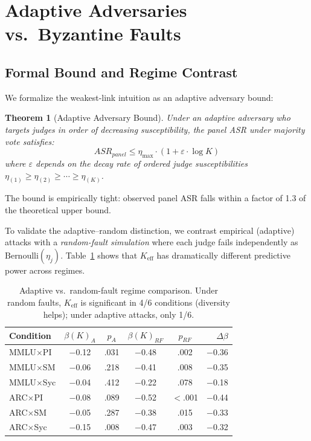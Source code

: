 \documentclass[11pt,a4paper]{article}
\newtheorem{theorem}{Theorem}
\begin{document}
\section{Adaptive Adversaries vs.\ Byzantine Faults}
\label{sec:bft}

\subsection{Formal Bound and Regime Contrast}

We formalize the weakest-link intuition as an adaptive adversary bound:

\begin{theorem}[Adaptive Adversary Bound]
Under an adaptive adversary who targets judges in order of decreasing susceptibility, the panel ASR under majority vote satisfies:
\begin{equation}
    \textit{ASR}_{\textit{panel}} \leq \eta_{\max} \cdot (1 + \varepsilon \cdot \log K)
\end{equation}
where $\varepsilon$ depends on the decay rate of ordered judge susceptibilities $\eta_{(1)} \geq \eta_{(2)} \geq \cdots \geq \eta_{(K)}$.
\end{theorem}

The bound is empirically tight: observed panel ASR falls within a factor of 1.3 of the theoretical upper bound.

To validate the adaptive--random distinction, we contrast empirical (adaptive) attacks with a \emph{random-fault simulation} where each judge fails independently as $\text{Bernoulli}(\eta_j)$. Table~\ref{tab:bft-contrast} shows that $K_{\text{eff}}$ has dramatically different predictive power across regimes.

\begin{table}[t]
\centering
\small
\caption{Adaptive vs.\ random-fault regime comparison. Under random faults, $K_{\text{eff}}$ is significant in 4/6 conditions (diversity helps); under adaptive attacks, only 1/6.}
\label{tab:bft-contrast}
\begin{tabular}{@{}lccccr@{}}
\toprule
Condition & $\beta(K)_A$ & $p_A$ & $\beta(K)_{RF}$ & $p_{RF}$ & $\Delta\beta$ \\
\midrule
MMLU$\times$PI  & $-$0.12 & .031 & $-$0.48 & .002 & $-$0.36 \\
MMLU$\times$SM  & $-$0.06 & .218 & $-$0.41 & .008 & $-$0.35 \\
MMLU$\times$Syc & $-$0.04 & .412 & $-$0.22 & .078 & $-$0.18 \\
ARC$\times$PI   & $-$0.08 & .089 & $-$0.52 & {$<$.001} & $-$0.44 \\
ARC$\times$SM   & $-$0.05 & .287 & $-$0.38 & .015 & $-$0.33 \\
ARC$\times$Syc  & $-$0.15 & .008 & $-$0.47 & .003 & $-$0.32 \\
\bottomrule
\end{tabular}
\vspace{-2mm}
\end{table}
\end{document}
